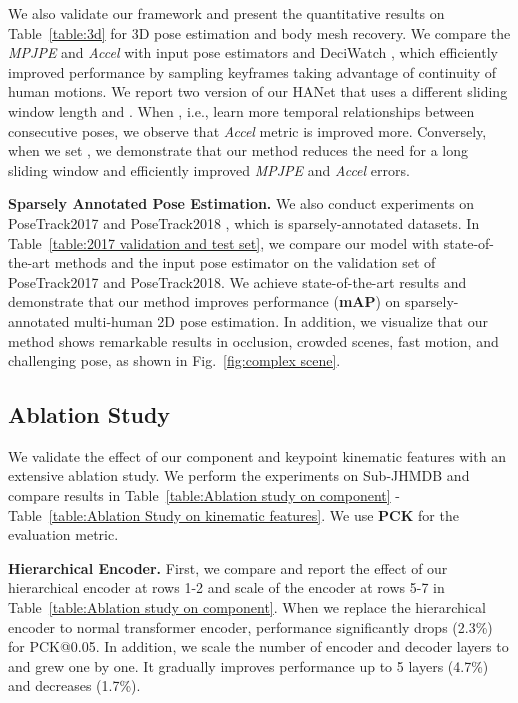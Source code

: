 \documentclass[10pt,twocolumn,letterpaper]{article}
\begin{document}
We also validate our framework and present the quantitative results on Table~\ref{table:3d} for 3D pose estimation and body mesh recovery. We compare the \textit{MPJPE} and \textit{Accel} with input pose estimators \cite{fcn,li2022mhformer,spin,pare} and DeciWatch \cite{deciwatch}, which efficiently improved performance by sampling keyframes taking advantage of continuity of human motions. We report two version of our HANet that uses a different sliding window length  and . When , i.e., learn more temporal relationships between consecutive poses, we observe that \textit{Accel} metric is improved more. Conversely, when we set , we demonstrate that our method reduces the need for a long sliding window and efficiently improved \textit{MPJPE} and \textit{Accel} errors.

\textbf{Sparsely Annotated Pose Estimation.} We also conduct experiments on PoseTrack2017 \cite{posetrack2017} and PoseTrack2018 \cite{posetrack2018}, which is sparsely-annotated datasets. In Table~\ref{table:2017 validation and test set}, we compare our model with state-of-the-art methods \cite{hrnet,posewarper,dcpose} and the input pose estimator \cite{dcpose} on the validation set of PoseTrack2017 and PoseTrack2018. We achieve state-of-the-art results and demonstrate that our method improves performance (\textbf{mAP}) on sparsely-annotated multi-human 2D pose estimation. In addition, we visualize that our method shows remarkable results in occlusion, crowded scenes, fast motion, and challenging pose, as shown in Fig.~\ref{fig:complex scene}.  

\subsection{Ablation Study}

We validate the effect of our component and keypoint kinematic features with an extensive ablation study. We perform the experiments on Sub-JHMDB \cite{jhmdb} and compare results in Table~\ref{table:Ablation study on component} - Table~\ref{table:Ablation Study on kinematic features}. We use  \textbf{PCK} for the evaluation metric.

\textbf{Hierarchical Encoder.} First, we compare and report the effect of our hierarchical encoder at rows 1-2 and scale of the encoder at rows 5-7 in Table~\ref{table:Ablation study on component}. When we replace the hierarchical encoder to normal transformer encoder, performance significantly drops (2.3\%) for PCK@0.05. In addition, we scale the number of encoder and decoder layers  to  and grew one by one. It gradually improves performance up to 5 layers (4.7\%) and decreases (1.7\%). 
\end{document}
